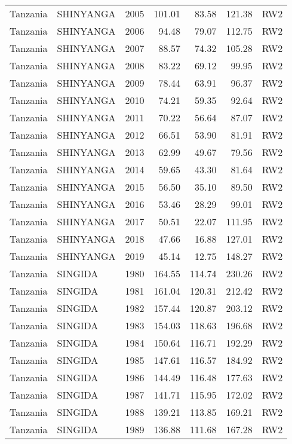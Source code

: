 \begin{longtable}{lllrrrl}
  Tanzania & SHINYANGA & 2005 & 101.01 & 83.58 & 121.38 & RW2 \\ 
  Tanzania & SHINYANGA & 2006 & 94.48 & 79.07 & 112.75 & RW2 \\ 
  Tanzania & SHINYANGA & 2007 & 88.57 & 74.32 & 105.28 & RW2 \\ 
  Tanzania & SHINYANGA & 2008 & 83.22 & 69.12 & 99.95 & RW2 \\ 
  Tanzania & SHINYANGA & 2009 & 78.44 & 63.91 & 96.37 & RW2 \\ 
  Tanzania & SHINYANGA & 2010 & 74.21 & 59.35 & 92.64 & RW2 \\ 
  Tanzania & SHINYANGA & 2011 & 70.22 & 56.64 & 87.07 & RW2 \\ 
  Tanzania & SHINYANGA & 2012 & 66.51 & 53.90 & 81.91 & RW2 \\ 
  Tanzania & SHINYANGA & 2013 & 62.99 & 49.67 & 79.56 & RW2 \\ 
  Tanzania & SHINYANGA & 2014 & 59.65 & 43.30 & 81.64 & RW2 \\ 
  Tanzania & SHINYANGA & 2015 & 56.50 & 35.10 & 89.50 & RW2 \\ 
  Tanzania & SHINYANGA & 2016 & 53.46 & 28.29 & 99.01 & RW2 \\ 
  Tanzania & SHINYANGA & 2017 & 50.51 & 22.07 & 111.95 & RW2 \\ 
  Tanzania & SHINYANGA & 2018 & 47.66 & 16.88 & 127.01 & RW2 \\ 
  Tanzania & SHINYANGA & 2019 & 45.14 & 12.75 & 148.27 & RW2 \\ 
  Tanzania & SINGIDA & 1980 & 164.55 & 114.74 & 230.26 & RW2 \\ 
  Tanzania & SINGIDA & 1981 & 161.04 & 120.31 & 212.42 & RW2 \\ 
  Tanzania & SINGIDA & 1982 & 157.44 & 120.87 & 203.12 & RW2 \\ 
  Tanzania & SINGIDA & 1983 & 154.03 & 118.63 & 196.68 & RW2 \\ 
  Tanzania & SINGIDA & 1984 & 150.64 & 116.71 & 192.29 & RW2 \\ 
  Tanzania & SINGIDA & 1985 & 147.61 & 116.57 & 184.92 & RW2 \\ 
  Tanzania & SINGIDA & 1986 & 144.49 & 116.48 & 177.63 & RW2 \\ 
  Tanzania & SINGIDA & 1987 & 141.71 & 115.95 & 172.02 & RW2 \\ 
  Tanzania & SINGIDA & 1988 & 139.21 & 113.85 & 169.21 & RW2 \\ 
  Tanzania & SINGIDA & 1989 & 136.88 & 111.68 & 167.28 & RW2 \\ 

\end{longtable}
